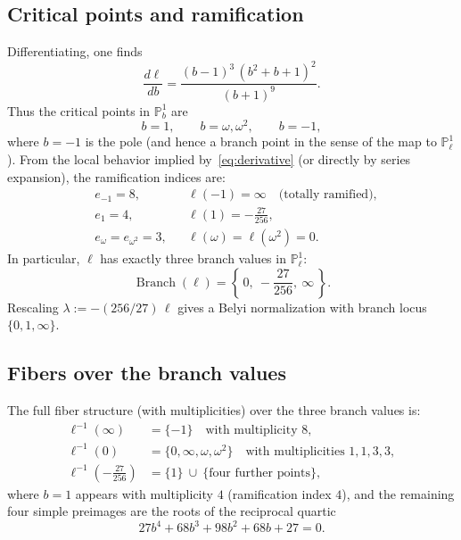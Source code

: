 \documentclass[11pt, a4paper]{article}
\newcommand{\PP}{\mathbb{P}}
\newcommand{\om}{\omega}
\newcommand{\Branch}{\operatorname{Branch}}
\numberwithin{equation}{section}
\begin{document}
\subsection{Critical points and ramification}
Differentiating, one finds
\begin{equation}\label{eq:derivative}
  \frac{d\ell}{db}
  = \frac{(b-1)^3\,(b^2+b+1)^2}{(b+1)^9}.
\end{equation}
Thus the critical points in $\PP^1_b$ are
\begin{equation}
  b=1,\qquad b=\om,\om^2,\qquad b=-1,
\end{equation}
where $b=-1$ is the pole (and hence a branch point in the sense of the map to $\PP^1_\ell$).
From the local behavior implied by~\eqref{eq:derivative} (or directly by series expansion), the ramification indices are:
\begin{align}
  &e_{-1}=8, &&\ell(-1)=\infty\quad\text{(totally ramified)},\\
  &e_{1}=4,  &&\ell(1)= -\frac{27}{256},\\
  &e_{\om}=e_{\om^2}=3, &&\ell(\om)=\ell(\om^2)=0.
\end{align}
In particular, $\ell$ has exactly three branch values in $\PP^1_\ell$:
\begin{equation}
  \Branch(\ell)=\left\{\,0,\ -\frac{27}{256},\ \infty\,\right\}.
\end{equation}
Rescaling $\lambda:=-(256/27)\,\ell$ gives a Belyi normalization with branch locus $\{0,1,\infty\}$.

\subsection{Fibers over the branch values}
The full fiber structure (with multiplicities) over the three branch values is:
\begin{align}
  \ell^{-1}(\infty) &= \{-1\}\quad\text{with multiplicity }8,\\[3pt]
  \ell^{-1}(0) &= \{0,\infty,\om,\om^2\}\quad\text{with multiplicities }1,1,3,3,\\[3pt]
  \ell^{-1}\!\left(-\frac{27}{256}\right)
  &= \{1\}\ \cup\ \{\text{four further points}\},
\end{align}
where $b=1$ appears with multiplicity $4$ (ramification index $4$), and the remaining four simple preimages are the roots of the reciprocal quartic
\begin{equation}\label{eq:quartic-preimages}
  27 b^4 + 68 b^3 + 98 b^2 + 68 b + 27 = 0.
\end{equation}
\end{document}
